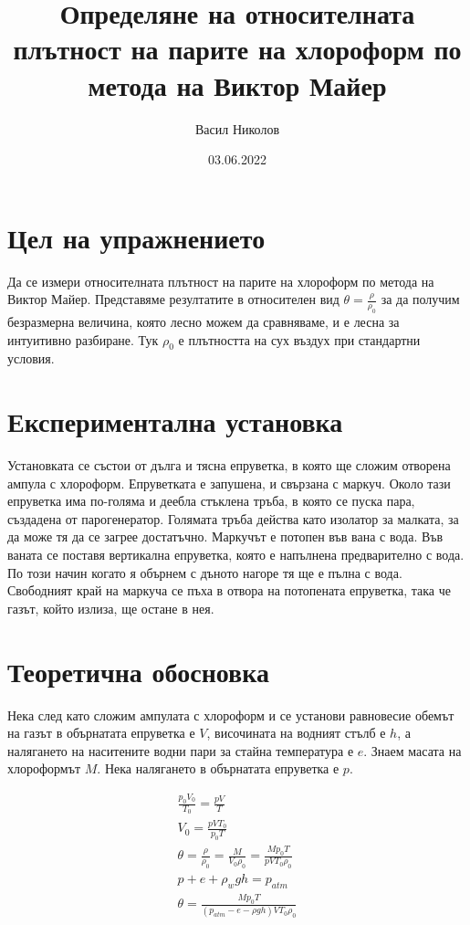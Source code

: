 \documentclass[%
 reprint,
 amsmath,amssymb,
 aps,
]{revtex4-2}
\begin{document}
\setlength{\abovedisplayskip}{3pt}
\setlength{\belowdisplayskip}{3pt}    

\title{Определяне на относителната плътност на парите на хлороформ по метода на Виктор Майер}
\author{Васил Николов}
\date{03.06.2022}
\maketitle
\section{Цел на упражнението}

Да се измери относителната плътност на парите на хлороформ по метода на Виктор Майер. Представяме резултатите в относителен вид $\theta = \frac{\rho}{\rho_0}$ за да получим безразмерна величина, която лесно можем да сравняваме, и е лесна за интуитивно разбиране. Тук $\rho_0$ е плътността на сух въздух при стандартни условия.

\section{Експериментална установка}

Установката се състои от дълга и тясна епруветка, в която ще сложим отворена ампула с хлороформ. Епруветката е запушена, и свързана с маркуч. Около тази епруветка има по-голяма и деебла стъклена тръба, в която се пуска пара, създадена от парогенератор. Голямата тръба действа като изолатор за малката, за да може тя да се загрее достатъчно. Маркучът е потопен във вана с вода. Във ваната се поставя вертикална епруветка, която е напълнена предварително с вода. По този начин когато я обърнем с дъното нагоре тя ще е пълна с вода. Свободният край на маркуча се пъха в отвора на потопената епруветка, така че газът, който излиза, ще остане в нея. 

\section{Теоретична обосновка}

Нека след като сложим ампулата с хлороформ и се установи равновесие обемът на газът в обърнатата епруветка е $V$, височината на водният стълб е $h$, а налягането на наситените водни пари за стайна температура е $e$. Знаем масата на хлороформът $M$. Нека налягането в обърнатата епруветка е $p$.

\begin{gather*}
    \frac{p_0 V_0}{T_0} = \frac{p V}{T} \\
    V_0 = \frac{p V T_0}{p_0 T} \\
    \theta = \frac{\rho}{\rho_0} = \frac{M}{V_0 \rho_0} = \frac{M p_0 T}{p V T_0 \rho_0}\\
    p + e + \rho_w g h = p_{atm} \\
    \theta = \frac{M p_0 T}{(p_{atm} - e - \rho g h) V T_0 \rho_0} \label{eq:1} \tag{1}
\end{gather*}
\end{document}
